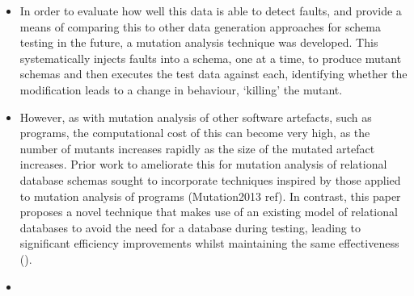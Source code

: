 \begin{itemize}
  \item In order to evaluate how well this data is able to detect faults, and provide a means of comparing this to other data generation approaches for schema testing in the future, a mutation analysis technique was developed. This systematically injects faults into a schema, one at a time, to produce mutant schemas and then executes the test data against each, identifying whether the modification leads to a change in behaviour, `killing' the mutant.

  \item However, as with mutation analysis of other software artefacts, such as programs, the computational cost of this can become very high, as the number of mutants increases rapidly as the size of the mutated artefact increases. Prior work to ameliorate this for mutation analysis of relational database schemas sought to incorporate techniques inspired by those applied to mutation analysis of programs (Mutation2013 ref). In contrast, this paper proposes a novel technique that makes use of an existing model of relational databases to avoid the need for a database during testing, leading to significant efficiency improvements whilst maintaining the same effectiveness ().

  \item {}

\end{itemize}
